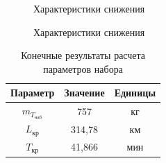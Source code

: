 \begin{figure}[H]
    \caption{Характеристики снижения}
    \label{fig:Характеристики Спуска1}
\end{figure}

\begin{figure}[H]
    \caption{Характеристики снижения}
    \label{fig:Характеристики Спуска2}
\end{figure}

\begin{table}[H]
    \centering
    \caption{Конечные результаты расчета параметров набора}
    \begin{tabular}{|c|c|c|}
    \hline
        Параметр & Значение &Единицы\\ \hline
        $m_{T_\text{наб}}$ & 757 &кг\\ \hline
        $L_\text{кр}$ & 314,78 & км\\ \hline
        $T_\text{кр}$ & 41,866 & мин\\ \hline
    \end{tabular}
    \label{tab:Крейсер}
\end{table}

